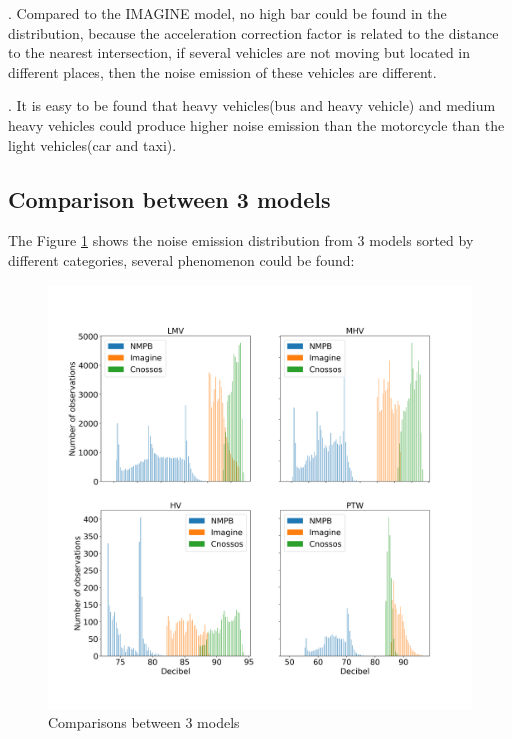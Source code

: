 \documentclass{article}
\begin{document}
. Compared to the IMAGINE model, no high bar could be found in the distribution, because the acceleration correction factor is related to the distance to the nearest intersection, if several vehicles are not moving but located in different places, then the noise emission of these vehicles are different.

. It is easy to be found that heavy vehicles(bus and heavy vehicle) and medium heavy vehicles could produce higher noise emission than the motorcycle than the light vehicles(car and taxi).

\newpage

\subsection{Comparison between 3 models}

\noindent The Figure \ref{Comparisons between 3 models} shows the noise emission distribution from 3 models sorted by different categories, several phenomenon could be found:
\begin{figure}[h]
    \begin{center}
        \includegraphics[width=14cm]{Comparisons between 3 models.png}
        \caption{Comparisons between 3 models}
        \label{Comparisons between 3 models}
    \end{center}
\end{figure}
\end{document}

